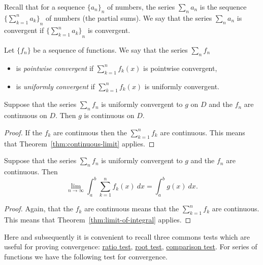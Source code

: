 Recall that for a sequence \({\{a_n\}}_{n}\) of numbers,
the series \(\sum_{n}a_n\) is the sequence \({\{\sum_{k=1}^{n}a_k\}}_{n}\) of numbers (the partial sums).
We say that the series  \(\sum_{n}a_n\) is convergent if \({\{\sum_{k=1}^{n}a_k\}}_{n}\) is convergent.



\begin{definition}
  Let \(\{f_n\}\) be a sequence of functions.
  We say that the series \(\sum_{n} f_n\)
  \begin{itemize}
    \item   is \emph{pointwise convergent} if
          \(\sum_{k=1}^{n} f_k(x)\) is pointwise convergent,
    \item   is \emph{uniformly convergent} if
          \(\sum_{k=1}^{n} f_k(x)\) is uniformly convergent.
  \end{itemize}
\end{definition}


\begin{theorem}
  Suppose that the series \(\sum_{n} f_n\) is uniformly convergent to \(g\) on \(D\) and the \(f_n\) are continuous on \(D\).
  Then \(g\) is continuous on \(D\).
\end{theorem}


\begin{proof}
  If the \(f_k\) are continuous then the \(\sum_{k=1}^{n} f_k\) are continuous.
  This means that Theorem~\ref{thm:continuous-limit} applies.
\end{proof}



\begin{theorem}
  Suppose that the series \(\sum_{n} f_n\) is uniformly convergent to \(g\) and the \(f_n\) are continuous.
  Then
  \[
    \lim_{n\to\infty} \int_{a}^{b}  \sum_{k=1}^{n} f_k(x)  \ dx = \int_{a}^{b} g(x) \ dx.
  \]
\end{theorem}


\begin{proof}
  Again, that the \(f_k\) are continuous means that the \(\sum_{k=1}^{n} f_k\) are continuous.
  This means that Theorem~\ref{thm:limit-of-integral} applies.
\end{proof}


Here and subsequently it is convenient to recall three commons tests which are useful for proving convergence:
\href{https://en.wikipedia.org/wiki/Ratio_test}{ratio test},
\href{https://en.wikipedia.org/wiki/Root_test}{root test},
\href{https://en.wikipedia.org/wiki/Direct_comparison_test}{comparison test}.
%
For series of functions we have the following test for convergence.

